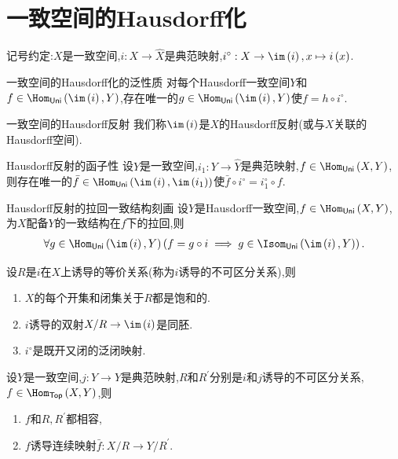 \section{一致空间的Hausdorff化}

记号约定:$X$是一致空间,$i:X\to\hat{X}$是典范映射,$i^{\circ}:X\to\im\left(i\right),x\mapsto i\left(x\right)$.

\begin{proposition}{一致空间的Hausdorff化的泛性质}{}
	对每个Hausdorff一致空间$Y$和$f\in\Hom_{\mathsf{Uni}}\left(\im\left(i\right),Y\right)$,存在唯一的$g\in\Hom_{\mathsf{Uni}}\left(\im\left(i\right),Y\right)$使$f=h\circ i^{\circ}$.
\end{proposition}

\begin{definition}{一致空间的Hausdorff反射}{}
	我们称$\im\left(i\right)$是$X$的Hausdorff反射(或与$X$关联的Hausdorff空间).
\end{definition}

\begin{corollary}{Hausdorff反射的函子性}{}
	设$Y$是一致空间,$i_{1}:Y\to\hat{Y}$是典范映射,$f\in\Hom_{\mathsf{Uni}}\left(X,Y\right)$,则存在唯一的$\bar{f}\in\Hom_{\mathsf{Uni}}\left(\im\left(i\right),\im\left(i_{1}\right)\right)$使$\bar{f}\circ i^{\circ}=i_{1}^{\circ}\circ f$.
\end{corollary}

\begin{proposition}{Hausdorff反射的拉回一致结构刻画}{}
	设$Y$是Hausdorff一致空间,$f\in\Hom_{\mathsf{Uni}}\left(X,Y\right)$,为$X$配备$Y$的一致结构在$f$下的拉回,则
	\begin{align*}
		\forall g\in\Hom_{\mathsf{Uni}}\left(\im\left(i\right),Y\right)\left(f=g\circ i\implies g\in\Isom_{\mathsf{Uni}}\left(\im\left(i\right),Y\right)\right).
	\end{align*}
\end{proposition}

\begin{remark}{}{}
	设$R$是$i$在$X$上诱导的等价关系(称为$i$诱导的不可区分关系),则
	\begin{enumerate}
		\item $X$的每个开集和闭集关于$R$都是饱和的.
		\item $i$诱导的双射$X/R\to\im\left(i\right)$是同胚.
		\item $i^{\circ}$是既开又闭的泛闭映射.
	\end{enumerate}
\end{remark}

\begin{remark}{}{}
	设$Y$是一致空间,$j:Y\to\hat{Y}$是典范映射,$R$和$R^{\prime}$分别是$i$和$j$诱导的不可区分关系,$f\in\Hom_{\mathsf{Top}}\left(X,Y\right)$,则
	\begin{enumerate}
		\item $f$和$R,R^{\prime}$都相容,
		\item $f$诱导连续映射$\bar{f}:X/R\to Y/R^{\prime}$.
	\end{enumerate}
\end{remark}
